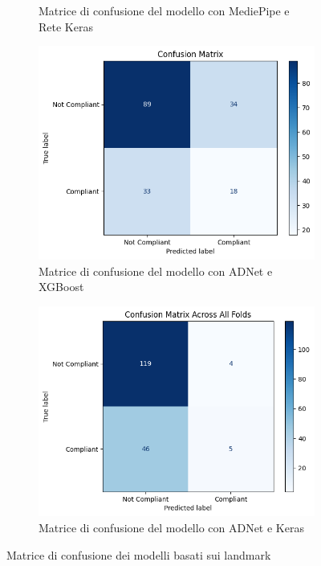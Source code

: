 \documentclass[12pt,a4paper,openright,twoside]{book}
\begin{document}
\begin{figure}[htbp]
\begin{subfigure}{0.45\textwidth}
        \caption{Matrice di confusione del modello con MediePipe e Rete Keras}
        \label{fig:mediapipe_keras_confusion_matrix}
    \end{subfigure}
    \begin{subfigure}{0.45\textwidth}
        \centering
        \includegraphics[width=\linewidth]{figures/adnet_xgboost_confusion_matrix.png}
        \caption{Matrice di confusione del modello con ADNet e XGBoost}
        \label{fig:adnet_xgboost_confusion_matrix}
    \end{subfigure}
    \hfill
    \begin{subfigure}{0.45\textwidth}
        \centering
        \includegraphics[width=\linewidth]{figures/adnet_keras_confusion_matrix.png}
        \caption{Matrice di confusione del modello con ADNet e Keras}
        \label{fig:adnet_keras_confusion_matrix}
    \end{subfigure}

    \caption{Matrice di confusione dei modelli basati sui landmark}
\end{figure}
\end{document}
